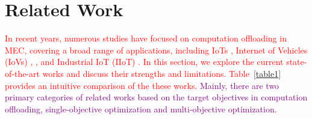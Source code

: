 \documentclass[10pt, journal,letterpaper]{IEEEtran}
\begin{document}
\section{Related Work}
\label{section:II}
 \textcolor{red}{In recent years, numerous studies have focused on computation offloading in MEC, covering a broad range of applications, including IoTs \cite{zhang2023multi}, Internet of Vehicles (IoVs) \cite{lin2022multi}, \cite{wei2023many}, and Industrial IoT (IIoT) \cite{yuan2023adaptive}. In this section, we explore the current state-of-the-art works and discuss their strengths and limitations.
 Table~\ref{table1} provides an intuitive comparison of the these works. }
  \textcolor{purple}{Mainly, there are two primary categories of related works based on the target objectives in computation offloading, single-objective optimization and multi-objective optimization.}
\end{document}
